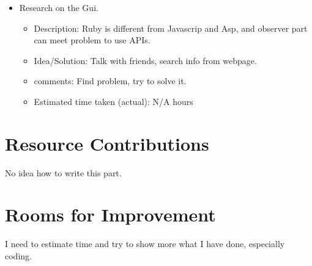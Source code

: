 \documentclass{article}
\begin{document}
\begin{itemize}
	\item Research on the Gui. 
	      \begin{itemize}
	         \item Description: Ruby is different from Javascrip and Asp, and observer part can meet problem to use APIs.
	         \item Idea/Solution: Talk with friends, search info from webpage.
	         \item comments: Find problem, try to solve it.
	         \item Estimated time taken (actual): N/A hours
	     \end{itemize}
\end{itemize}

\section*{Resource Contributions}

No idea how to write this part.

\section*{Rooms for Improvement}

I need to estimate time and try to show more what I have done, especially coding.
\end{document}
